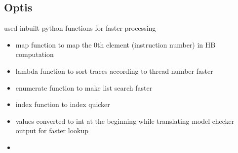 \subsection{Optis}
used inbuilt python functions for faster processing
\begin{itemize}
	\item map function to map the 0th element (instruction number) in HB computation
	\item lambda function to sort traces according to thread number faster
	\item enumerate function to make list search faster
	\item index function to index quicker
	\item values converted to int at the beginning while translating model checker output for faster lookup
	\item 
\end{itemize}

